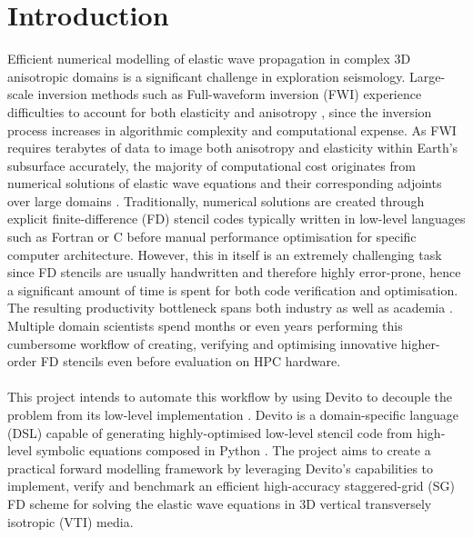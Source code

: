 \section{Introduction}
Efficient numerical modelling of elastic wave propagation in complex 3D anisotropic domains is a significant challenge in exploration seismology. Large-scale inversion methods such as Full-waveform inversion (FWI) experience difficulties to account for both elasticity and anisotropy \cite{kamath2017elastic}, since the inversion process increases in algorithmic complexity and computational expense. As FWI requires terabytes of data to image both anisotropy and elasticity within Earth's subsurface accurately, the majority of computational cost originates from numerical solutions of elastic wave equations and their corresponding adjoints over large domains \cite{witte2019large}. Traditionally, numerical solutions are created through explicit finite-difference (FD) stencil codes \cite{virieux1986p} typically written in low-level languages such as Fortran or C before manual performance optimisation for specific computer architecture. However, this in itself is an extremely challenging task since FD stencils are usually handwritten and therefore highly error-prone, hence a significant amount of time is spent for both code verification and optimisation. The resulting productivity bottleneck spans both industry as well as academia \cite{lange2016devito}. Multiple domain scientists spend months or even years \cite{louboutin2018devito} performing this cumbersome workflow of creating, verifying and optimising innovative higher-order FD stencils even before evaluation on HPC hardware.\\
\\
This project intends to automate this workflow by using Devito to decouple the problem from its low-level implementation \cite{kukreja2016devito}. Devito is a domain-specific language (DSL) capable of generating highly-optimised low-level stencil code from high-level symbolic equations composed in Python \cite{luporini2018architecture}. The project aims to create a practical forward modelling framework by leveraging Devito's capabilities to implement, verify and benchmark an efficient high-accuracy staggered-grid (SG) \cite{bansal2008finite, tarrass2011new} FD scheme \cite{xu2019modeling} for solving the elastic wave equations in 3D vertical transversely isotropic (VTI) media.
